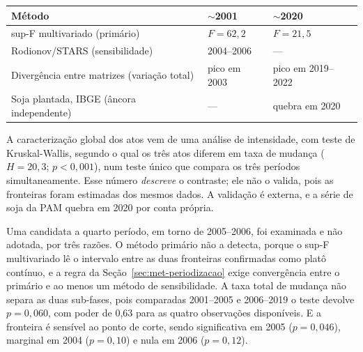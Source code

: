 \begin{quadro}[htb]
\centering
\caption[Convergência dos métodos de periodização]{Convergência dos métodos de periodização sobre as duas fronteiras.}
\label{quadro:quebras}
\small
\begin{tabular}{lll}
\toprule
\textbf{Método} & \textbf{$\sim$2001} & \textbf{$\sim$2020} \\
\midrule
sup-F multivariado (primário) & $F = 62{,}2$ & $F = 21{,}5$ \\
Rodionov/STARS (sensibilidade) & 2004--2006 & --- \\
Divergência entre matrizes (variação total) & pico em 2003 & pico em 2019--2022 \\
Soja plantada, IBGE (âncora independente) & --- & quebra em 2020 \\
\bottomrule
\end{tabular}
\end{quadro}

A caracterização global dos atos vem de uma análise de intensidade, com teste
de Kruskal-Wallis, segundo o qual os três atos diferem em taxa de mudança ($H
= 20{,}3$; $p < 0{,}001$), num teste único que compara os três períodos
simultaneamente. Esse número \emph{descreve} o contraste; ele não o valida, pois as
fronteiras foram estimadas dos mesmos dados. A validação é externa, e a série
de soja da PAM quebra em 2020 por conta própria.

Uma candidata a quarto período, em torno de 2005--2006, foi examinada e não
adotada, por três razões. O método primário não a detecta, porque o sup-F
multivariado lê o intervalo entre as duas fronteiras confirmadas como platô
contínuo, e a regra da Seção~\ref{sec:met-periodizacao} exige convergência
entre o primário e ao menos um método de sensibilidade. A taxa total de
mudança não separa as duas sub-fases, pois comparadas 2001--2005 e 2006--2019 o
teste devolve $p = 0{,}060$, com poder de 0,63 para as quatro observações
disponíveis. E a fronteira é sensível ao ponto de corte, sendo significativa
em 2005 ($p = 0{,}046$), marginal em 2004 ($p = 0{,}10$) e nula em 2006 ($p =
0{,}12$).

